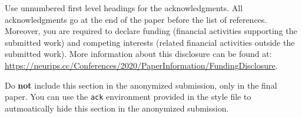 \documentclass{article}
\begin{document}
\begin{ack}
Use unnumbered first level headings for the acknowledgments. All acknowledgments
go at the end of the paper before the list of references. Moreover, you are required to declare 
funding (financial activities supporting the submitted work) and competing interests (related financial activities outside the submitted work). 
More information about this disclosure can be found at: \url{https://neurips.cc/Conferences/2020/PaperInformation/FundingDisclosure}.


Do {\bf not} include this section in the anonymized submission, only in the final paper. You can use the \texttt{ack} environment provided in the style file to autmoatically hide this section in the anonymized submission.
\end{ack}

\printbibliography

\newpage


\end{document}
